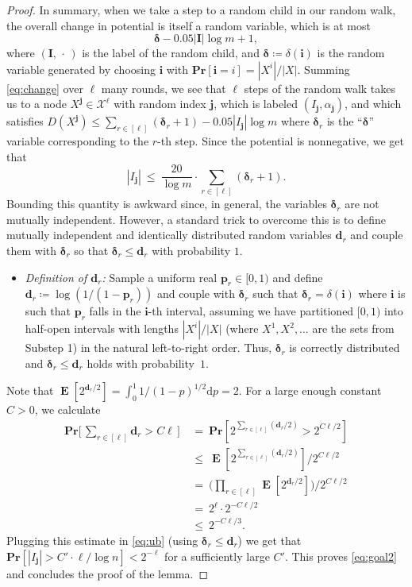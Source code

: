 \documentclass[11pt]{article}
\numberwithin{equation}{section}
\theoremstyle{definition}
\theoremstyle{plain}
\renewcommand{\Pr}{\mathbf{Pr}}
\DeclareMathOperator{\Ex}{\mathbf{E}}
\newcommand{\bi}{\bm{i}}
\newcommand{\bj}{\bm{j}}
\newcommand{\bdelta}{\bm{\delta}}
\newcommand{\p}{\bm{p}}
\renewcommand{\d}{\bm{d}}
\newcommand{\I}{\bm{I}}
\newcommand{\calX}{\mathcal{X}}
\begin{document}
\begin{proof}
In summary, when we take a step to a random child in our random walk, the overall change in potential is itself a random variable, which is at most
\begin{equation}\label{eq:change}
\bdelta-0.05|\I|\log m +1,
\end{equation}
where $(\I,\,\cdot\,)$ is the label of the random child, and $\bdelta\coloneqq \delta({\bi})$ is the random variable generated by choosing $\bi$ with $\Pr[\bi=i]=|X^i|/|X|$. Summing \eqref{eq:change} over $\ell$ many rounds, we see that $\ell$ steps of the random walk takes us to a node $X^{\bj}\in\calX^\ell$ with random index $\bj$, which is labeled $(I_{\bj},\alpha_{\bj})$, and which satisfies $D(X^{\bj}) \leq \sum_{r\in[\ell]}(\bdelta_r+1) - 0.05|I_{\bj}|\log m$ where $\bdelta_r$ is the ``$\bdelta$'' variable corresponding to the $r$-th step. Since the potential is nonnegative, we get that
\begin{equation}\label{eq:ub}
|I_{\bj}|~\leq~ \frac{20}{\log m} \cdot \sum_{r\in[\ell]} (\bdelta_r+1).
\end{equation}
Bounding this quantity is awkward since, in general, the variables $\bdelta_r$ are not mutually independent. However, a standard trick to overcome this is to define mutually independent and identically distributed random variables $\d_r$ and couple them with $\bdelta_r$ so that $\bdelta_r\leq\d_r$ with probability $1$.
\begin{itemize}
\item \emph{Definition of $\d_r$:}
Sample a uniform real $\p_r \in [0,1)$ and define $\d_r \coloneqq \log (1/(1-\p_r))$ and couple with $\bdelta_r$ such that $\bdelta_r = \delta(\bi)$ where $\bi$ is such that $\p_r$ falls in the $\bi$-th interval, assuming we have partitioned $[0,1)$ into half-open intervals with lengths $|X^i|/|X|$ (where $X^1,X^2,\ldots$ are the sets from Substep 1) in the natural left-to-right order. Thus, $\bdelta_r$ is correctly distributed and $\bdelta_r \le \d_r$ holds with probability~$1$.
\end{itemize}	
Note that $\Ex[2^{\d_r/2}] = \int_0^1 1/(1-p)^{1/2} \text{d}p = 2$. For a large enough constant $C>0$, we calculate
\begin{align*}
\textstyle\Pr\big[\,\sum_{r\in[\ell]} \d_r > C\ell\,\big]
&\textstyle~=~ \Pr[2^{\sum_{r\in[\ell]} (\d_r/2)} > 2^{C\ell/2}]\\
&\textstyle~\leq~ \Ex[2^{\sum_{r\in[\ell]} (\d_r/2)}]/2^{C\ell/2}\\
&\textstyle~=~ \big(\prod_{r\in[\ell]}\Ex[2^{\d_r/2}]\big)/2^{C\ell/2}\\
&\textstyle~=~ 2^{\ell} \cdot 2^{-C\ell/2}\\
&\textstyle~\leq~ 2^{-C\ell/3}.
\end{align*}
Plugging this estimate in \eqref{eq:ub} (using $\bdelta_r\leq\d_r$) we get that $\Pr[|I_{\bj}| > C'\cdot \ell/\log n] < 2^{-\ell}$ for a sufficiently large $C'$. This proves \eqref{eq:goal2} and concludes the proof of the lemma.
\end{proof}
\end{document}
